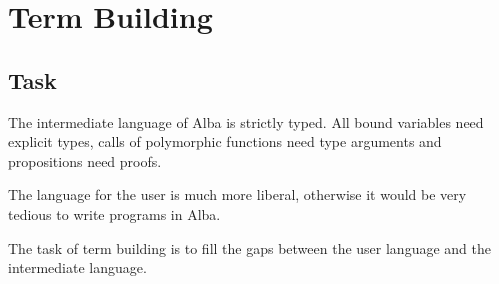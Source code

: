 \section{Term Building}


\subsection{Task}

The intermediate language of Alba is strictly typed. All bound variables need
explicit types, calls of polymorphic functions need type arguments and
propositions need proofs.

The language for the user is much more liberal, otherwise it would be very
tedious to write programs in Alba.

The task of term building is to fill the gaps between the user language and
the intermediate language.





